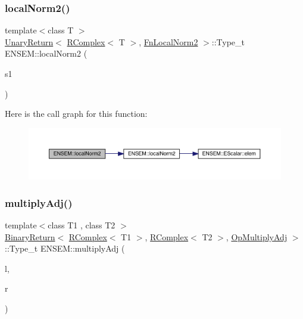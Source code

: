 \subsubsection{\texorpdfstring{localNorm2()}{localNorm2()}}
{\footnotesize\ttfamily template$<$class T $>$ \\
\mbox{\hyperlink{structENSEM_1_1UnaryReturn}{Unary\+Return}}$<$ \mbox{\hyperlink{classENSEM_1_1RComplex}{R\+Complex}}$<$ T $>$, \mbox{\hyperlink{structENSEM_1_1FnLocalNorm2}{Fn\+Local\+Norm2}} $>$\+::Type\+\_\+t E\+N\+S\+E\+M\+::local\+Norm2 (\begin{DoxyParamCaption}\item[{const \mbox{\hyperlink{classENSEM_1_1RComplex}{R\+Complex}}$<$ T $>$ \&}]{s1 }\end{DoxyParamCaption})\hspace{0.3cm}{\ttfamily [inline]}}

Here is the call graph for this function\+:\nopagebreak
\begin{figure}[H]
\begin{center}
\leavevmode
\includegraphics[width=350pt]{da/dc7/group__rcomplex_gaeb6b484f4bb6decc4552e2c635452b3f_cgraph}
\end{center}
\end{figure}
\mbox{\label{group__rcomplex_ga7147ce299498e423c79851ee598dcde3}} 
\subsubsection{\texorpdfstring{multiplyAdj()}{multiplyAdj()}}
{\footnotesize\ttfamily template$<$class T1 , class T2 $>$ \\
\mbox{\hyperlink{structENSEM_1_1BinaryReturn}{Binary\+Return}}$<$ \mbox{\hyperlink{classENSEM_1_1RComplex}{R\+Complex}}$<$ T1 $>$, \mbox{\hyperlink{classENSEM_1_1RComplex}{R\+Complex}}$<$ T2 $>$, \mbox{\hyperlink{structENSEM_1_1OpMultiplyAdj}{Op\+Multiply\+Adj}} $>$\+::Type\+\_\+t E\+N\+S\+E\+M\+::multiply\+Adj (\begin{DoxyParamCaption}\item[{const \mbox{\hyperlink{classENSEM_1_1RComplex}{R\+Complex}}$<$ T1 $>$ \&}]{l,  }\item[{const \mbox{\hyperlink{classENSEM_1_1RComplex}{R\+Complex}}$<$ T2 $>$ \&}]{r }\end{DoxyParamCaption})\hspace{0.3cm}{\ttfamily [inline]}}

